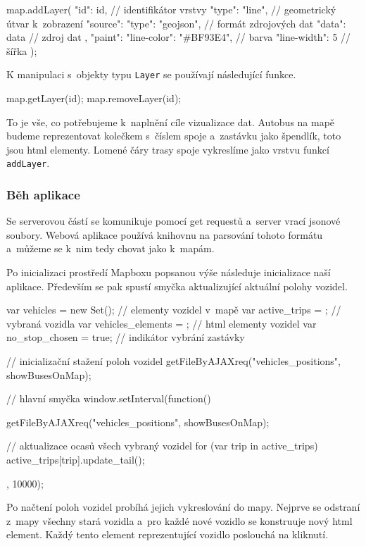 \begin{code}[frame=none]
map.addLayer({
  "id": id, // identifikátor vrstvy
  "type": "line", // geometrický útvar k~zobrazení
  "source": {
    "type": "geojson", // formát zdrojových dat
    "data": data // zdroj dat
  },
  "paint": {
    "line-color": "#BF93E4", // barva
    "line-width": 5 // šířka
  }
});
\end{code}


K manipulaci s~objekty typu \verb-Layer- se používají následující funkce.


\begin{code}[frame=none]
map.getLayer(id);
map.removeLayer(id);
\end{code}


To je vše, co potřebujeme k~naplnění cíle vizualizace dat. Autobus na mapě budeme reprezentovat kolečkem s~číslem spoje a~zastávku jako špendlík, toto jsou \gls{html} elementy. Lomené čáry trasy spoje vykreslíme jako vrstvu funkcí \verb-addLayer-.


\subsubsection{Běh aplikace}


Se serverovou částí se komunikuje pomocí get requestů a~server vrací \gls{json}ové soubory. Webová aplikace používá knihovnu na parsování tohoto formátu a~můžeme se k~nim tedy chovat jako k~mapám.


\bigbreak

Po inicializaci prostředí Mapboxu popsanou výše následuje inicializace naší aplikace. Především se pak spustí smyčka aktualizující aktuální polohy vozidel.


\begin{code}[frame=none]
var vehicles = new Set(); // elementy vozidel v~mapě
var active_trips = {}; // vybraná vozidla
var vehicles_elements = {}; // html elementy vozidel
var no_stop_chosen = true; // indikátor vybrání zastávky


// inicializační stažení poloh vozidel
getFileByAJAXreq("vehicles_positions", showBusesOnMap);


// hlavní smyčka
window.setInterval(function(){
getFileByAJAXreq("vehicles_positions", showBusesOnMap);


// aktualizace ocasů všech vybraný vozidel
for (var trip in active_trips){
  active_trips[trip].update_tail();
}
}, 10000);
\end{code}


Po načtení poloh vozidel probíhá jejich vykreslování do mapy. Nejprve se odstraní z~mapy všechny stará vozidla a~pro každé nové vozidlo se konstruuje nový \gls{html} element. Každý tento element reprezentující vozidlo poslouchá na kliknutí.


